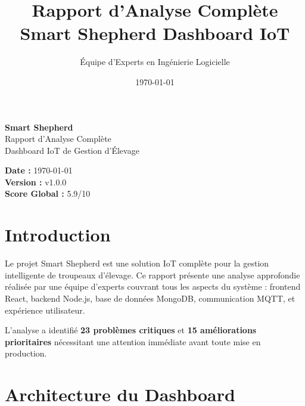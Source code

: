 \documentclass[a4paper,12pt]{article}
\title{\textbf{Rapport d'Analyse Complète} \\ \large Smart Shepherd Dashboard IoT}
\author{Équipe d'Experts en Ingénierie Logicielle}
\date{\today}
\begin{document}
\begin{titlepage}
    \centering
    \vspace*{2cm}
    
    {\Huge \textbf{Smart Shepherd}} \\[0.5cm]
    {\Large Rapport d'Analyse Complète} \\[0.3cm]
    {\large Dashboard IoT de Gestion d'Élevage} \\[1cm]
    
    
    \vspace*{1.5cm}
    
    {\large \textbf{Date :} \today} \\[0.3cm]
    {\large \textbf{Version :} v1.0.0} \\[0.3cm]
    {\large \textbf{Score Global :} \textcolor{alertred}{5.9/10}}
    
    \vfill
\end{titlepage}

\tableofcontents
\newpage

\section{Introduction}

\begin{tcolorbox}[colback=primaryblue!10, colframe=primaryblue, title={\faIcon{info-circle} Contexte du Projet}]
Le projet Smart Shepherd est une solution IoT complète pour la gestion intelligente de troupeaux d'élevage. Ce rapport présente une analyse approfondie réalisée par une équipe d'experts couvrant tous les aspects du système : frontend React, backend Node.js, base de données MongoDB, communication MQTT, et expérience utilisateur.

L'analyse a identifié \textbf{23 problèmes critiques} et \textbf{15 améliorations prioritaires} nécessitant une attention immédiate avant toute mise en production.
\end{tcolorbox}

\section{Architecture du Dashboard}
\end{document}
